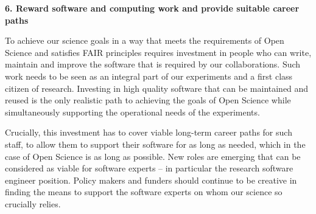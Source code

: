 {\bf 6. Reward software and computing work and provide suitable career paths}

To achieve our science goals in a way that meets the requirements of Open Science and satisfies FAIR principles requires investment in people who can write, maintain and improve the software that is required by our collaborations. Such work needs to be seen as an integral part of our experiments and a first class citizen of research.  Investing in high quality software that can be maintained and reused is the only realistic path to achieving the goals of Open Science while simultaneously supporting the operational needs of the experiments.

Crucially, this investment has to cover viable long-term career paths for such staff, to allow them to support their software for as long as needed, which in the case of Open Science is as long as possible.
New roles are emerging that can be considered as viable for software experts -- in particular the research software engineer position. Policy makers and funders should continue to be creative in finding the means to support the software experts on whom our science so crucially relies.
